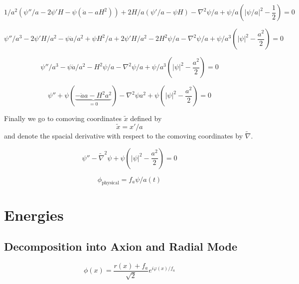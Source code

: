 \documentclass[a4paper]{article}
\begin{document}
\begin{equation}
    1/a^2 ( \psi'' / a - 2 \psi' H - \psi ( \ddot{a} - a H^2 ) ) + 2 H / a (\psi' / a - \psi H)
    - \nabla^2 \psi / a + \psi / a \left( |\psi / a|^2 - \frac{1}{2} \right) = 0
\end{equation}

\begin{equation}
    \psi'' / a^3 - 2 \psi' H / a^2 - \psi \ddot{a} / a^2 + \psi H^2 / a
    + 2 \psi' H / a^2 - 2 H^2 \psi / a
    - \nabla^2 \psi / a + \psi / a^3 ( |\psi|^2 - \frac{a^2}{2} ) = 0
\end{equation}

\begin{equation}
    \psi'' / a^3 - \psi \ddot{a} / a^2 - H^2 \psi / a
    - \nabla^2 \psi / a + \psi / a^3 ( |\psi|^2 - \frac{a^2}{2} ) = 0
\end{equation}

\begin{equation}
    \psi'' + \psi (\underbrace{- \ddot{a} a - H^2 a^2}_{= 0})
    - \nabla^2 \psi a^2 + \psi ( |\psi|^2 - \frac{a^2}{2} ) = 0
\end{equation}

Finally we go to comoving coordinates $\tilde{x}$ defined by
\begin{equation}
    \tilde{x} = x' / a
\end{equation}
and denote the spacial derivative with respect to the comoving coordinates by $\tilde{\nabla}$.

\begin{equation}
    \psi'' - \tilde{\nabla}^2 \psi + \psi ( |\psi|^2 - \frac{a^2}{2} ) = 0
\end{equation}

\begin{equation}
    \phi_\mathrm{physical} = f_a \psi / a(t)
\end{equation}

\section{Energies}

\subsection{Decomposition into Axion and Radial Mode}
\begin{equation}
    \phi(x) = \frac{r(x) + f_a}{\sqrt{2}} e^{i \varphi(x) / f_a }
\end{equation}
\end{document}
